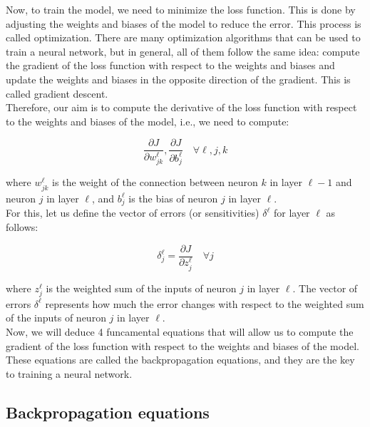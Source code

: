 Now, to train the model, we need to minimize the loss function. This is done by
adjusting the weights and biases of the model to reduce the error. This process
is called optimization. There are many optimization algorithms that can be used
to train a neural network, but in general, all of them follow the same idea:
compute the gradient of the loss function with respect to the weights and biases
and update the weights and biases in the opposite direction of the gradient.
This is called gradient descent.\\

Therefore, our aim is to compute the derivative of the loss function with respect
to the weights and biases of the model, i.e., we need to compute:

\begin{equation}
    \frac{\partial J}{\partial w^\ell_{jk}}, \frac{\partial J}{\partial b^\ell_j} \quad \forall \ell, j, k
\end{equation}

where $w^\ell_{jk}$ is the weight of the connection between neuron $k$ in layer $\ell-1$
and neuron $j$ in layer $\ell$, and $b^\ell_j$ is the bias of neuron $j$ in layer $\ell$.\\

For this, let us define the vector of errors (or sensitivities) $\delta^\ell$ for 
layer $\ell$ as follows:

\begin{equation}
    \delta^\ell_j = \frac{\partial J}{\partial z^\ell_j} \quad \forall j
\end{equation}

where $z^\ell_j$ is the weighted sum of the inputs of neuron $j$ in layer $\ell$.
The vector of errors $\delta^\ell$ represents how much the error changes with respect
to the weighted sum of the inputs of neuron $j$ in layer $\ell$.\\

Now, we will deduce 4 funcamental equations that will allow us to compute the
gradient of the loss function with respect to the weights and biases of the model.
These equations are called the backpropagation equations, and they are the key
to training a neural network.\\

\subsection{Backpropagation equations}

